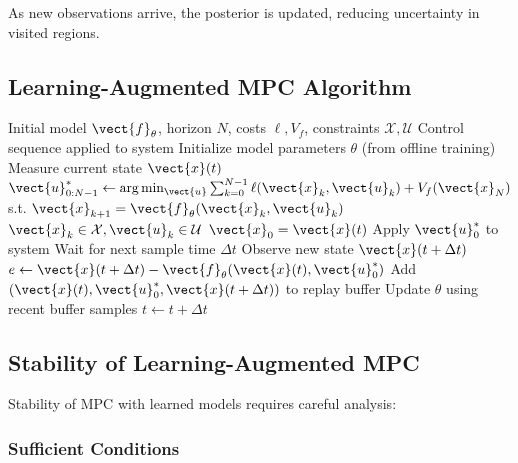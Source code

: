 As new observations arrive, the posterior is updated, reducing uncertainty in visited regions.

\subsection{Learning-Augmented MPC Algorithm}

\begin{algorithm}[H]
\caption{Learning-Augmented Model Predictive Control}
\label{alg:learning_mpc}
\begin{algorithmic}[1]
\REQUIRE Initial model $\vect{f}_\theta$, horizon $N$, costs $\ell, V_f$, constraints $\mathcal{X}, \mathcal{U}$
\ENSURE Control sequence applied to system
\STATE Initialize model parameters $\theta$ (from offline training)
\STATE
\LOOP
    \STATE Measure current state $\vect{x}(t)$
    \STATE
    \STATE {}
    \STATE $\vect{u}_{0:N-1}^* \gets \arg\min_{\vect{u}} \sum_{k=0}^{N-1} \ell(\vect{x}_k, \vect{u}_k) + V_f(\vect{x}_N)$
    \STATE \quad s.t. $\vect{x}_{k+1} = \vect{f}_\theta(\vect{x}_k, \vect{u}_k)$
    \STATE \quad\quad\; $\vect{x}_k \in \mathcal{X}, \vect{u}_k \in \mathcal{U}$
    \STATE \quad\quad\; $\vect{x}_0 = \vect{x}(t)$
    \STATE
    \STATE {}
    \STATE Apply $\vect{u}_0^*$ to system
    \STATE Wait for next sample time $\Delta t$
    \STATE
    \STATE {}
    \STATE Observe new state $\vect{x}(t + \Delta t)$
    \STATE $e \gets \vect{x}(t + \Delta t) - \vect{f}_\theta(\vect{x}(t), \vect{u}_0^*)$
        \STATE Add $(\vect{x}(t), \vect{u}_0^*, \vect{x}(t+\Delta t))$ to replay buffer
        \STATE Update $\theta$ using recent buffer samples
    \ENDIF
    \STATE
    \STATE $t \gets t + \Delta t$
\ENDLOOP
\end{algorithmic}
\end{algorithm}

\subsection{Stability of Learning-Augmented MPC}

Stability of MPC with learned models requires careful analysis:

\subsubsection{Sufficient Conditions}

